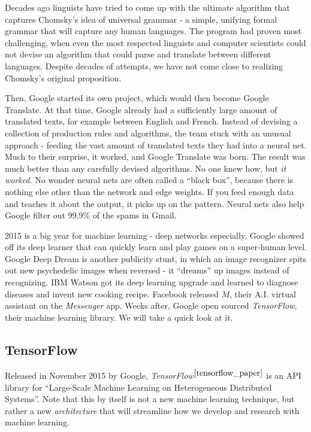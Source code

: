 \documentclass[12pt]{article}  %
\begin{document}
Decades ago linguists have tried to come up with the ultimate algorithm that captures Chomsky's idea of universal grammar - a simple, unifying formal grammar that will capture any human languages. The program had proven most challenging, when even the most respected linguists and computer scientists could not devise an algorithm that could parse and translate between different languages. Despite decades of attempts, we have not come close to realizing Chomsky's original proposition.

Then, Google started its own project, which would then become Google Translate. At that time, Google already had a sufficiently large amount of translated texts, for example between English and French. Instead of devising a collection of production rules and algorithms, the team stuck with an unusual approach - feeding the vast amount of translated texts they had into a neural net. Much to their surprise, it worked, and Google Translate was born. The result was much better than any carefully devised algorithms. No one knew how, but \emph{it worked}. No wonder neural nets are often called a ``black box'', because there is nothing else other than the network and edge weights. If you feed enough data and teaches it about the output, it picks up on the pattern. Neural nets also help Google filter out $99.9\%$ of the spams in Gmail.


2015 is a big year for machine learning - deep networks especially. Google showed off its deep learner that can quickly learn and play games on a super-human level. Google Deep Dream is another publicity stunt, in which an image recognizer spits out new psychedelic images when reversed - it ``dreams'' up images instead of recognizing. IBM Watson got its deep learning upgrade and learned to diagnose diseases and invent new cooking recipe. Facebook released $M$, their A.I. virtual assistant on the \emph{Messenger} app. Weeks after, Google open sourced \emph{TensorFlow}, their machine learning library. We will take a quick look at it.


\subsection{TensorFlow}

Released in November 2015 by Google, \emph{TensorFlow}$^{\ref{tensorflow_paper}}$ is an API library for ``Large-Scale Machine Learning on Heterogeneous Distributed Systems''. Note that this by itself is not a new machine learning technique, but rather a new \emph{architecture} that will streamline how we develop and research with machine learning.
\end{document}
